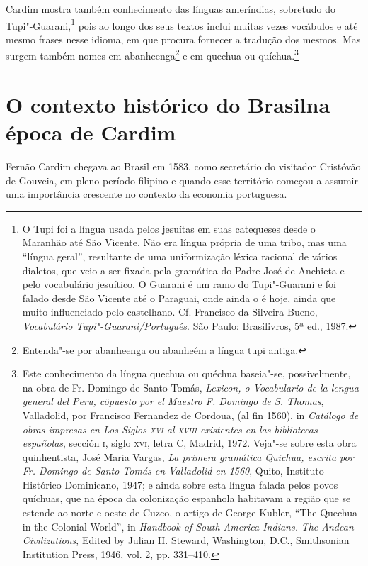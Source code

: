 Cardim mostra também conhecimento das línguas ameríndias, sobretudo
do Tupi"-Guarani,\footnote{ O Tupi foi a língua usada pelos
jesuítas em suas catequeses desde o Maranhão até São Vicente. Não era
língua própria de uma tribo, mas uma ``língua geral'', resultante de uma
uniformização léxica racional de vários dialetos, que veio a ser
fixada pela gramática do Padre José de Anchieta e pelo vocabulário
jesuítico. O Guarani é um ramo do Tupi"-Guarani e foi falado
desde São Vicente até o Paraguai, onde ainda o é hoje, ainda que muito
influenciado pelo castelhano. Cf. Francisco da Silveira Bueno,
\textit{Vocabulário Tupi"-Guarani/Português}. São Paulo: Brasilivros, 
5ª ed., 1987.} pois ao longo dos seus textos inclui muitas 
vezes vocábulos e até mesmo frases nesse idioma, em que procura
fornecer a tradução dos mesmos. Mas surgem também nomes em
abanheenga\footnote{ Entenda"-se por abanheenga ou
abanheém a língua tupi antiga.} e em quechua ou 
quíchua.\footnote{ Este conhecimento da língua quechua ou
quéchua baseia"-se, possivelmente, na obra de Fr. Domingo de Santo
Tomás, \textit{Lexicon, o Vocabulario de la lengua general del Peru,
cõpuesto por el Maestro F. Domingo de S. Thomas}, Valladolid, por
Francisco Fernandez de Cordoua, (al fin 1560), in \textit{Catálogo de
obras impresas en Los Siglos \textsc{xvi} al \textsc{xviii} existentes en las
bibliotecas españolas}, sección \textsc{i}, siglo \textsc{xvi}, letra C, Madrid, 1972.
Veja"-se sobre esta obra quinhentista, José Maria Vargas, \textit{La
primera gramática Quichua, escrita por Fr. Domingo de Santo Tomás en
Valladolid en 1560}, Quito, Instituto Histórico Dominicano, 1947; e
ainda sobre esta língua falada pelos povos quíchuas, que na época 
da colonização espanhola habitavam a região que se estende ao
norte e oeste de Cuzco, o artigo de George Kubler, ``The Quechua in the
Colonial World'', in \textit{Handbook of South America Indians.}
\textit{The Andean Civilizations}, Edited by Julian H. Steward,
Washington, D.C., Smithsonian Institution Press, 1946, vol. 2, pp. 331--410.}

\section{O contexto histórico do Brasil\break na época de Cardim} 

Fernão Cardim chegava ao Brasil em 1583, como secretário do visitador
Cristóvão de Gouveia, em pleno período filipino e quando esse território 
começou a assumir uma importância crescente no contexto da economia portuguesa. 

